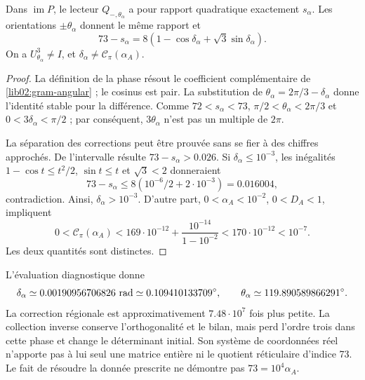 \begin{corollary}
\label{lib02:fase-alpha}
Dans \(\operatorname{im}P\), le lecteur \(Q_{-,\theta_\alpha}\) a pour rapport quadratique exactement \(s_\alpha\). Les orientations \(\pm\theta_\alpha\) donnent le même rapport et
\[
 73-s_\alpha
 =8(1-\cos\delta_\alpha+\sqrt3\sin\delta_\alpha).
\]
On a \(U_{\theta_\alpha}^3\ne I\), et \(\delta_\alpha\ne\mathcal C_\pi(\alpha_A)\).
\end{corollary}
\begin{proof}
La définition de la phase résout le coefficient complémentaire de
\eqref{lib02:gram-angular} ; le cosinus est pair. La substitution de
\(\theta_\alpha=2\pi/3-\delta_\alpha\) donne l’identité stable
pour la différence. Comme \(72<s_\alpha<73\),
\(\pi/2<\theta_\alpha<2\pi/3\) et
\(0<3\delta_\alpha<\pi/2\) ; par conséquent, \(3\theta_\alpha\)
n’est pas un multiple de \(2\pi\).

La séparation des corrections peut être prouvée sans se fier à des chiffres approchés. De l'intervalle résulte \(73-s_\alpha>0.026\). Si \(\delta_\alpha\leq10^{-3}\), les inégalités \(1-\cos t\leq t^2/2\), \(\sin t\leq t\) et \(\sqrt3<2\) donneraient
\[
 73-s_\alpha\leq8(10^{-6}/2+2\cdot10^{-3})=0.016004,
\]
contradiction. Ainsi, \(\delta_\alpha>10^{-3}\). D’autre part,
\(0<\alpha_A<10^{-2}\), \(0<D_A<1\), impliquent
\[
 0<\mathcal C_\pi(\alpha_A)
 <169\cdot10^{-12}+\frac{10^{-14}}{1-10^{-2}}
 <170\cdot10^{-12}<10^{-7}.
\]
Les deux quantités sont distinctes.
\end{proof}

L'évaluation diagnostique donne
\[
 \delta_\alpha\simeq0.00190956706826\ {\rm rad}
 \simeq0.109410133709^\circ,\qquad
 \theta_\alpha\simeq119.890589866291^\circ.
\]
La correction régionale est approximativement \(7.48\cdot10^7\) fois
plus petite. La collection inverse conserve l’orthogonalité et le bilan, mais perd
l’ordre trois dans cette phase et change le déterminant initial. Son système de coordonnées
réel n’apporte pas à lui seul une matrice entière ni le quotient réticulaire
d’indice 73. Le fait de résoudre la donnée prescrite ne démontre pas
\(73=10^4\alpha_A\).

